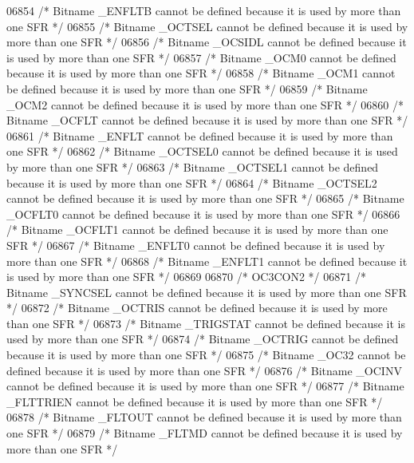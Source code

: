 \begin{DoxyCode}
06854 \textcolor{comment}{/* Bitname \_ENFLTB cannot be defined because it is used by more than one SFR */}
06855 \textcolor{comment}{/* Bitname \_OCTSEL cannot be defined because it is used by more than one SFR */}
06856 \textcolor{comment}{/* Bitname \_OCSIDL cannot be defined because it is used by more than one SFR */}
06857 \textcolor{comment}{/* Bitname \_OCM0 cannot be defined because it is used by more than one SFR */}
06858 \textcolor{comment}{/* Bitname \_OCM1 cannot be defined because it is used by more than one SFR */}
06859 \textcolor{comment}{/* Bitname \_OCM2 cannot be defined because it is used by more than one SFR */}
06860 \textcolor{comment}{/* Bitname \_OCFLT cannot be defined because it is used by more than one SFR */}
06861 \textcolor{comment}{/* Bitname \_ENFLT cannot be defined because it is used by more than one SFR */}
06862 \textcolor{comment}{/* Bitname \_OCTSEL0 cannot be defined because it is used by more than one SFR */}
06863 \textcolor{comment}{/* Bitname \_OCTSEL1 cannot be defined because it is used by more than one SFR */}
06864 \textcolor{comment}{/* Bitname \_OCTSEL2 cannot be defined because it is used by more than one SFR */}
06865 \textcolor{comment}{/* Bitname \_OCFLT0 cannot be defined because it is used by more than one SFR */}
06866 \textcolor{comment}{/* Bitname \_OCFLT1 cannot be defined because it is used by more than one SFR */}
06867 \textcolor{comment}{/* Bitname \_ENFLT0 cannot be defined because it is used by more than one SFR */}
06868 \textcolor{comment}{/* Bitname \_ENFLT1 cannot be defined because it is used by more than one SFR */}
06869 
06870 \textcolor{comment}{/* OC3CON2 */}
06871 \textcolor{comment}{/* Bitname \_SYNCSEL cannot be defined because it is used by more than one SFR */}
06872 \textcolor{comment}{/* Bitname \_OCTRIS cannot be defined because it is used by more than one SFR */}
06873 \textcolor{comment}{/* Bitname \_TRIGSTAT cannot be defined because it is used by more than one SFR */}
06874 \textcolor{comment}{/* Bitname \_OCTRIG cannot be defined because it is used by more than one SFR */}
06875 \textcolor{comment}{/* Bitname \_OC32 cannot be defined because it is used by more than one SFR */}
06876 \textcolor{comment}{/* Bitname \_OCINV cannot be defined because it is used by more than one SFR */}
06877 \textcolor{comment}{/* Bitname \_FLTTRIEN cannot be defined because it is used by more than one SFR */}
06878 \textcolor{comment}{/* Bitname \_FLTOUT cannot be defined because it is used by more than one SFR */}
06879 \textcolor{comment}{/* Bitname \_FLTMD cannot be defined because it is used by more than one SFR */}

\end{DoxyCode}
